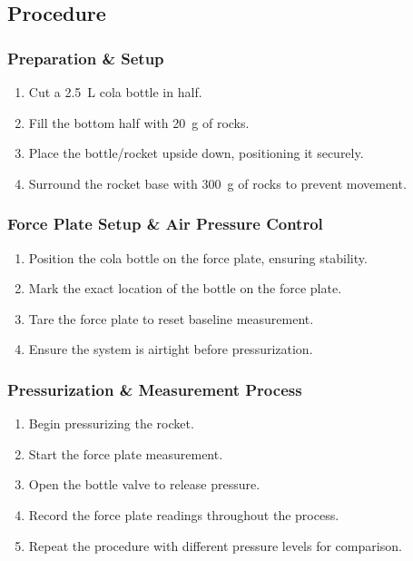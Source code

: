 \documentclass[12pt,a4paper]{article}
\begin{document}
\subsection{Procedure}

\subsubsection{Preparation \& Setup}
\begin{enumerate}
    \item Cut a \SI{2.5}{\liter} cola bottle in half.
    \item Fill the bottom half with \SI{20}{\gram} of rocks.
    \item Place the bottle/rocket upside down, positioning it securely.
    \item Surround the rocket base with \SI{300}{\gram} of rocks to prevent movement.
\end{enumerate}

\subsubsection{Force Plate Setup \& Air Pressure Control}
\begin{enumerate}
    \item Position the cola bottle on the force plate, ensuring stability.
    \item Mark the exact location of the bottle on the force plate.
    \item Tare the force plate to reset baseline measurement.
    \item Ensure the system is airtight before pressurization.
\end{enumerate}

\subsubsection{Pressurization \& Measurement Process}
\begin{enumerate}
    \item Begin pressurizing the rocket.
    \item Start the force plate measurement.
    \item Open the bottle valve to release pressure.
    \item Record the force plate readings throughout the process.
    \item Repeat the procedure with different pressure levels for comparison.
\end{enumerate}
\end{document}
